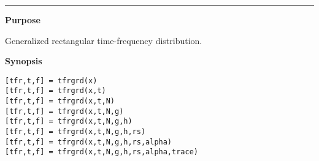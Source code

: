 

\hspace*{-1.6cm}{\Large \bf tfrgrd}

\vspace*{-.4cm}
\hspace*{-1.6cm}\rule[0in]{16.5cm}{.02cm}
\vspace*{.2cm}

{\bf \large {}\selectfont Purpose}\\
\hspace*{1.5cm}
\begin{minipage}[t]{13.5cm}
Generalized rectangular time-frequency distribution.
\end{minipage}
\vspace*{.5cm}

{\bf \large {}\selectfont Synopsis}\\
\hspace*{1.5cm}
\begin{minipage}[t]{13.5cm}
\begin{verbatim}
[tfr,t,f] = tfrgrd(x)
[tfr,t,f] = tfrgrd(x,t)
[tfr,t,f] = tfrgrd(x,t,N)
[tfr,t,f] = tfrgrd(x,t,N,g)
[tfr,t,f] = tfrgrd(x,t,N,g,h)
[tfr,t,f] = tfrgrd(x,t,N,g,h,rs)
[tfr,t,f] = tfrgrd(x,t,N,g,h,rs,alpha)
[tfr,t,f] = tfrgrd(x,t,N,g,h,rs,alpha,trace)
\end{verbatim}
\end{minipage}
\vspace*{.5cm}

